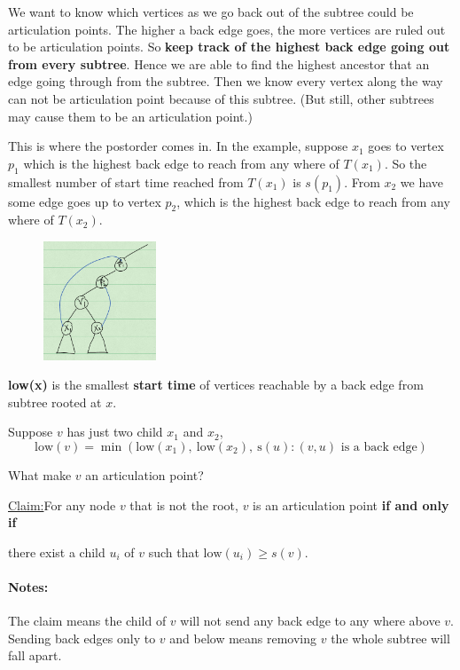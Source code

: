 \documentclass[en,hazy,blue,screen,14pt]{elegantnote}
\newenvironment{claim}[1]{\par\noindent\underline{Claim:}\space#1}{}
\begin{document}
We want to know which vertices as we go back out of the subtree could be 
articulation points. The higher a back edge goes, the more vertices are ruled 
out to be articulation points. So \textbf{keep track of the highest back edge 
going out from every subtree}. Hence we are able to find the highest ancestor 
that an edge going through from the subtree. Then we know every vertex along the 
way can not be articulation point because of this subtree. (But still, other 
subtrees may cause them to be an articulation point.)

This is where the postorder comes in. In the example, suppose $x_1$ goes to vertex $p_1$ which is the highest back edge to reach from any where of $T(x_1)$. So the smallest number of start time reached from $T(x_1)$ is $s(p_1)$. From $x_2$ we have some edge goes up to vertex $p_2$, which is the highest back edge to reach from any where of $T(x_2)$.

\begin{figure}[H]
\centering
\includegraphics[width=0.3\textwidth]{dfs-claim.png}
\end{figure}

\begin{definition}
 \textbf{low(x)} is the smallest \textbf{start time} of vertices reachable by a back edge from subtree rooted at $x$. 
\end{definition}

Suppose $v$ has just two child $x_1$ and $x_2$,
\[\text{low}(v) = \min (\text{low}(x_1), ~\text{low}(x_2), ~\text{s}(u): (v, u) \text{ is a back edge})\]

What make $v$ an articulation point?
\begin{claim}
 For any node $v$ that is not the root, $v$ is an articulation point \textbf{if 
and only if }
 
 there exist a child $u_i$ of $v$ such that $\text{low}(u_i) \ge s(v)$.
\end{claim}

\paragraph{Notes:} The claim means the child of $v$ will not send any back edge 
to any where above $v$. Sending back edges only to $v$ and below means removing 
$v$ the whole subtree will fall apart.
\end{document}
